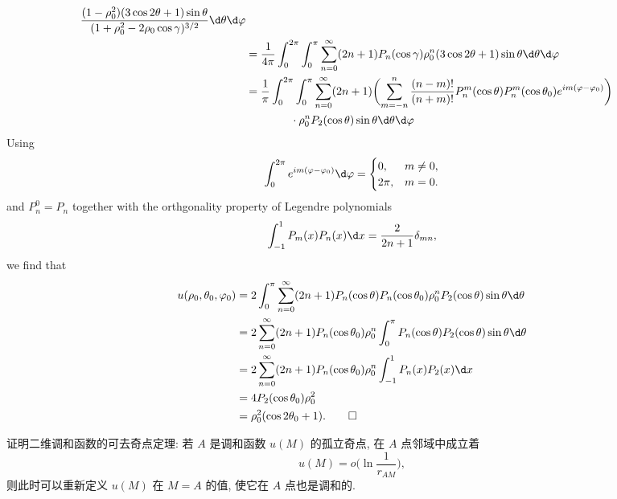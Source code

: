 \begin{solution}
\begin{equation}
\begin{aligned}
          \frac{(1-\rho_0^2)(3\cos2\theta+1)\sin\theta}{(1+\rho_0^2-2\rho_0\cos\gamma)^{3/2}}
          \d\theta\d\varphi \\
      & = \frac{1}{4\pi} \int_0^{2\pi} \int_0^\pi
          \sum_{n=0}^\infty (2n+1) P_n(\cos\gamma)\rho_0^n (3\cos2\theta+1) \sin\theta
          \d\theta\d\varphi \\
      & = \frac{1}{\pi} \int_0^{2\pi} \int_0^\pi
          \sum_{n=0}^\infty (2n+1) \biggl(\sum_{m=-n}^n \frac{(n-m)!}{(n+m)!} P_n^m(\cos\theta)
          P_n^m(\cos\theta_0) e^{im(\varphi-\varphi_0)}\biggr) \\
      & \qquad\qquad \cdot\rho_0^n P_2(\cos\theta) \sin\theta \d\theta\d\varphi
    \end{aligned}
  \end{equation}
  Using
  \[ \int_0^{2\pi} e^{im(\varphi-\varphi_0)} \d\varphi
      = \begin{cases}
        0,    & m\neq 0, \\
        2\pi, & m=0.
      \end{cases}\]
  and $P_n^0=P_n$ together with the orthgonality property of Legendre polynomials
  \[ \int_{-1}^1 P_m(x)P_n(x) \d x = \frac{2}{2n+1}\delta_{mn}, \]
  we find that
  \begin{equation}\label{eq:3.8}
    \begin{aligned}
      u(\rho_0,\theta_0,\varphi_0)
      & = 2 \int_0^\pi \sum_{n=0}^\infty (2n+1) P_n(\cos\theta) P_n(\cos\theta_0)
          \rho_0^n P_2(\cos\theta) \sin\theta \d\theta \\
      & = 2 \sum_{n=0}^\infty (2n+1) P_n(\cos\theta_0) \rho_0^n
          \int_0^\pi P_n(\cos\theta) P_2(\cos\theta) \sin\theta \d\theta \\
      & = 2 \sum_{n=0}^\infty (2n+1) P_n(\cos\theta_0) \rho_0^n
          \int_{-1}^1 P_n(x) P_2(x) \d x \\
      & = 4 P_2(\cos\theta_0) \rho_0^2 \\
      & = \rho_0^2 (\cos2\theta_0+1). \qedhere
    \end{aligned}
  \end{equation}
\end{solution}


\begin{exercise}
  证明二维调和函数的可去奇点定理:
  若 $A$ 是调和函数 $u(M)$ 的孤立奇点, 在 $A$ 点邻域中成立着
  \[u(M) = o\biggl(\ln\frac{1}{r_{AM}}\biggr),\]
  则此时可以重新定义 $u(M)$ 在 $M=A$ 的值, 使它在 $A$ 点也是调和的.
\end{exercise}

